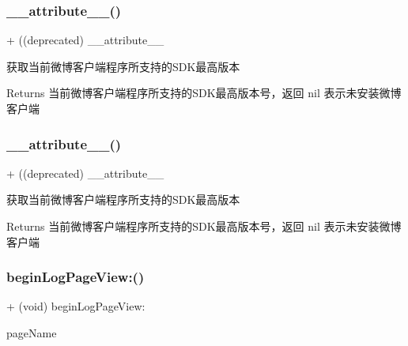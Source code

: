 \subsubsection{\texorpdfstring{\+\_\+\+\_\+attribute\+\_\+\+\_\+()}{\_\_attribute\_\_()}\hspace{0.1cm}{\footnotesize\ttfamily [2/3]}}
{\footnotesize\ttfamily + ((deprecated) \+\_\+\+\_\+attribute\+\_\+\+\_\+ \begin{DoxyParamCaption}{ }\end{DoxyParamCaption}}

获取当前微博客户端程序所支持的\+S\+D\+K最高版本 \begin{DoxyReturn}{Returns}
当前微博客户端程序所支持的\+S\+D\+K最高版本号，返回 nil 表示未安装微博客户端 
\end{DoxyReturn}
\mbox{\label{interface_weibo_s_d_k_a40d5808e5f4f3957ef8255baeaa3c484}} 
\subsubsection{\texorpdfstring{\+\_\+\+\_\+attribute\+\_\+\+\_\+()}{\_\_attribute\_\_()}\hspace{0.1cm}{\footnotesize\ttfamily [3/3]}}
{\footnotesize\ttfamily + ((deprecated) \+\_\+\+\_\+attribute\+\_\+\+\_\+ \begin{DoxyParamCaption}{ }\end{DoxyParamCaption}}

获取当前微博客户端程序所支持的\+S\+D\+K最高版本 \begin{DoxyReturn}{Returns}
当前微博客户端程序所支持的\+S\+D\+K最高版本号，返回 nil 表示未安装微博客户端 
\end{DoxyReturn}
\mbox{\label{interface_weibo_s_d_k_ae9b18093f71e740c51f254fb517e818d}} 
\subsubsection{\texorpdfstring{begin\+Log\+Page\+View\+:()}{beginLogPageView:()}\hspace{0.1cm}{\footnotesize\ttfamily [1/3]}}
{\footnotesize\ttfamily + (void) begin\+Log\+Page\+View\+: \begin{DoxyParamCaption}\item[{(N\+S\+String $\ast$)}]{page\+Name }\end{DoxyParamCaption}}

